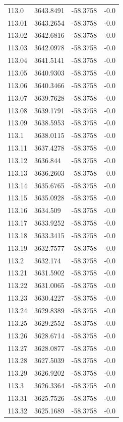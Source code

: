 \begin{table}[H]
\begin{tabular}{llll}
113.0 & 3643.8491 & -58.3758 & -0.0 \\
113.01 & 3643.2654 & -58.3758 & -0.0 \\
113.02 & 3642.6816 & -58.3758 & -0.0 \\
113.03 & 3642.0978 & -58.3758 & -0.0 \\
113.04 & 3641.5141 & -58.3758 & -0.0 \\
113.05 & 3640.9303 & -58.3758 & -0.0 \\
113.06 & 3640.3466 & -58.3758 & -0.0 \\
113.07 & 3639.7628 & -58.3758 & -0.0 \\
113.08 & 3639.1791 & -58.3758 & -0.0 \\
113.09 & 3638.5953 & -58.3758 & -0.0 \\
113.1 & 3638.0115 & -58.3758 & -0.0 \\
113.11 & 3637.4278 & -58.3758 & -0.0 \\
113.12 & 3636.844 & -58.3758 & -0.0 \\
113.13 & 3636.2603 & -58.3758 & -0.0 \\
113.14 & 3635.6765 & -58.3758 & -0.0 \\
113.15 & 3635.0928 & -58.3758 & -0.0 \\
113.16 & 3634.509 & -58.3758 & -0.0 \\
113.17 & 3633.9252 & -58.3758 & -0.0 \\
113.18 & 3633.3415 & -58.3758 & -0.0 \\
113.19 & 3632.7577 & -58.3758 & -0.0 \\
113.2 & 3632.174 & -58.3758 & -0.0 \\
113.21 & 3631.5902 & -58.3758 & -0.0 \\
113.22 & 3631.0065 & -58.3758 & -0.0 \\
113.23 & 3630.4227 & -58.3758 & -0.0 \\
113.24 & 3629.8389 & -58.3758 & -0.0 \\
113.25 & 3629.2552 & -58.3758 & -0.0 \\
113.26 & 3628.6714 & -58.3758 & -0.0 \\
113.27 & 3628.0877 & -58.3758 & -0.0 \\
113.28 & 3627.5039 & -58.3758 & -0.0 \\
113.29 & 3626.9202 & -58.3758 & -0.0 \\
113.3 & 3626.3364 & -58.3758 & -0.0 \\
113.31 & 3625.7526 & -58.3758 & -0.0 \\
113.32 & 3625.1689 & -58.3758 & -0.0 \\

\end{tabular}
\end{table}
